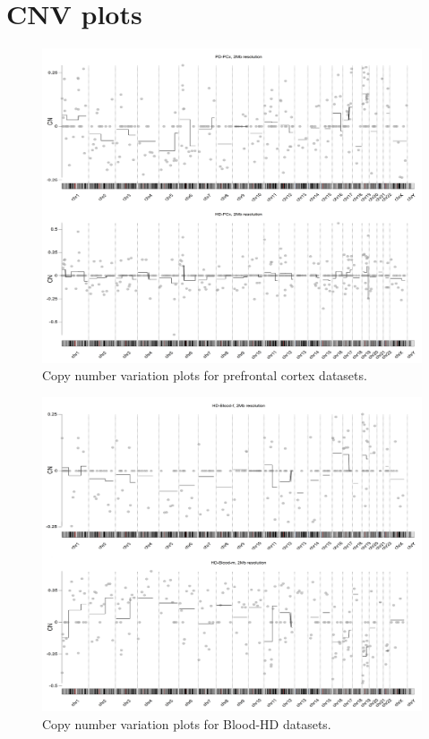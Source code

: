 \chapter{CNV plots} \label{cnvplots}

\begin{figure}[!ht] 
    \centerline{\includegraphics[width = 12.5cm]{Figures/CNV/cnv.jpg}}
\caption{Copy number variation plots for prefrontal cortex datasets.}
\label{fig:cnv-pcx}
\end{figure}

\begin{figure}[!ht] 
    \centerline{\includegraphics[width = 13cm]{Figures/CNV/cnv2.jpg}}
\caption{Copy number variation plots for Blood-HD datasets.}
\label{fig:cnv-blood}
\end{figure}

